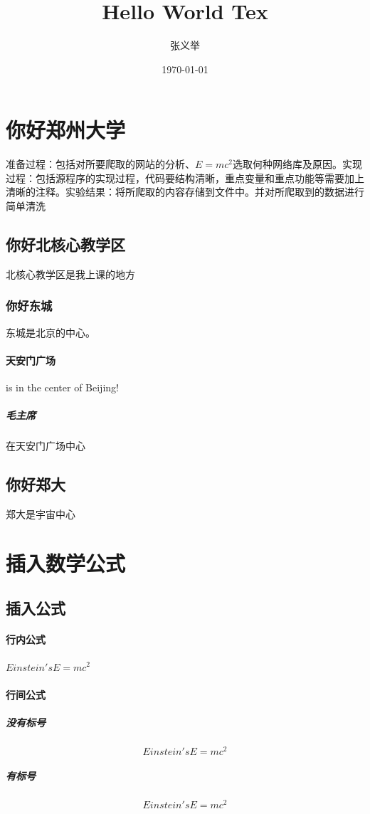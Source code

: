 \documentclass[UTF8]{ctexart}
\title{Hello World Tex}
\author{张义举}
\date{\today}
\begin{document}
\maketitle
\tableofcontents

\section{你好郑州大学}
准备过程：包括对所要爬取的网站的分析、$E=mc^2$选取何种网络库及原因。实现过程：包括源程序的实现过程，代码要结构清晰，重点变量和重点功能等需要加上清晰的注释。实验结果：将所爬取的内容存储到文件中。并对所爬取到的数据进行简单清洗
\subsection{你好北核心教学区}
北核心教学区是我上课的地方
\subsubsection{你好东城}
东城是北京的中心。
\paragraph{天安门广场}
is in the center of Beijing!
\subparagraph{毛主席}
在天安门广场中心
\subsection{你好郑大}
郑大是宇宙中心

\section{插入数学公式}

\subsection{插入公式}
\paragraph{行内公式}
$Einstein 's  E=mc^2$
\paragraph{行间公式}
\subparagraph{没有标号}
\[Einstein 's  E=mc^2\]
\subparagraph{有标号}
\begin{equation}
Einstein 's  E=mc^2
\end{equation}
\end{document}

